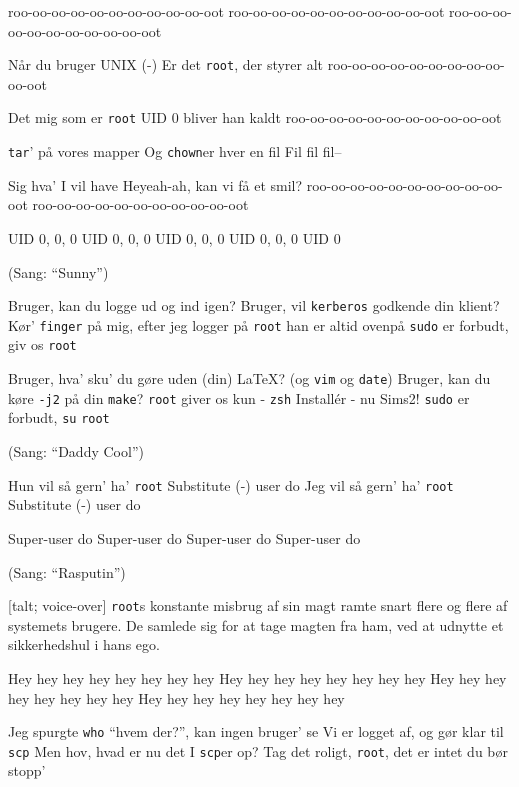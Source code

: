 \documentclass[a4paper,11pt]{article}
\begin{document}
\begin{song}

 roo-oo-oo-oo-oo-oo-oo-oo-oo-oo-oot
roo-oo-oo-oo-oo-oo-oo-oo-oo-oo-oot
roo-oo-oo-oo-oo-oo-oo-oo-oo-oo-oot

 Når du bruger UNIX
 (-) Er det \texttt{root}, der styrer alt
roo-oo-oo-oo-oo-oo-oo-oo-oo-oo-oot

 Det mig som er \texttt{root}
 UID 0 bliver han kaldt
roo-oo-oo-oo-oo-oo-oo-oo-oo-oo-oot

 \texttt{tar}' på vores mapper
Og \texttt{chown}er hver en fil
Fil fil fil--

 Sig hva' I vil have
 Heyeah-ah, kan vi få et smil?
roo-oo-oo-oo-oo-oo-oo-oo-oo-oo-oot
roo-oo-oo-oo-oo-oo-oo-oo-oo-oo-oot

 UID 0, 0, 0
UID 0, 0, 0
UID 0, 0, 0
UID 0, 0, 0
UID 0

(Sang: ``Sunny'')

 Bruger, kan du logge ud og ind igen?
Bruger, vil \texttt{kerberos} godkende din klient?
 Kør' \texttt{finger} på mig, efter jeg logger på
\texttt{root} han er altid ovenpå
 \texttt{sudo} er forbudt, giv os \texttt{root}

 Bruger, hva' sku' du gøre uden (din) \LaTeX{}? (og \texttt{vim} og \texttt{date})
Bruger, kan du køre \texttt{-j2} på din \texttt{make}?
 \texttt{root} giver os kun - \texttt{zsh}
Installér - nu Sims2!
 \texttt{sudo} er forbudt, \texttt{su} \texttt{root}

(Sang: ``Daddy Cool'')

 Hun vil så gern' ha' \texttt{root}
 Substitute (-) user do
Jeg vil så gern' ha' \texttt{root}
Substitute (-) user do

 Super-user do
Super-user do
Super-user do
Super-user do

(Sang: ``Rasputin'')

[talt; voice-over] \texttt{root}s konstante misbrug af sin magt
ramte snart flere og flere af systemets brugere.
De samlede sig for at tage magten fra ham, ved at udnytte et sikkerhedshul i hans ego.


 Hey hey hey hey hey hey hey hey
 Hey hey hey hey hey hey hey hey
 Hey hey hey hey hey hey hey hey
 Hey hey hey hey hey hey hey hey

 Jeg spurgte \texttt{who} ``hvem der?'', kan ingen bruger' se
 Vi er logget af, og gør klar til \texttt{scp}
 Men hov, hvad er nu det I \texttt{scp}er op?
 Tag det roligt, \texttt{root}, det er intet du bør stopp'


\end{song}
\end{document}
